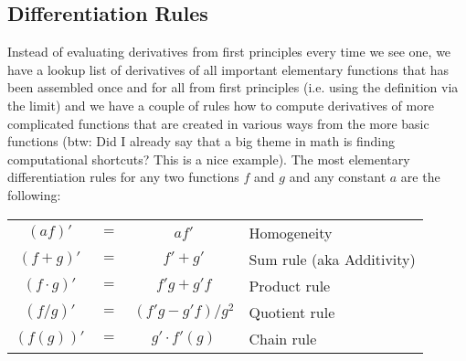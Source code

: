 \subsection{Differentiation Rules}
Instead of evaluating derivatives from first principles every time we see one, we have a lookup list of derivatives of all important elementary functions that has been assembled once and for all from first principles (i.e. using the definition via the limit) and we have a couple of rules how to compute derivatives of more complicated functions that are created in various ways from the more basic functions (btw: Did I already say that a big theme in math is finding computational shortcuts? This is a nice example). The most elementary differentiation rules for any two functions $f$ and $g$ and any constant $a$ are the following:

\medskip
\begin{tabular}{c c c l}
  $(a f)'$        &$=$& $ a f'$              & Homogeneity \\
  $(f + g)'$      &$=$& $f' + g'$            & Sum rule (aka Additivity) \\
  $(f \cdot g)'$  &$=$& $f' g + g' f$        & Product rule \\
  $(f / g)'$      &$=$& $(f' g - g' f)/g^2$  & Quotient rule \\
  $(f( g))'$      &$=$& $g' \cdot f'(g)$     & Chain rule \\
\end{tabular}
\medskip





